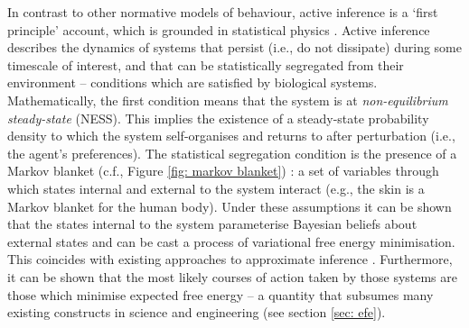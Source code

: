\documentclass{article}
\begin{document}
In contrast to other normative models of behaviour, active inference is a ‘first principle’ account, which is grounded in statistical physics \cite{parrMarkovBlanketsInformation2019,fristonFreeEnergyPrinciple2019}. Active inference describes the dynamics of systems that persist (i.e., do not dissipate) during some timescale of interest, and that can be statistically segregated from their environment -- conditions which are satisfied by biological systems. Mathematically, the first condition means that the system is at \textit{non-equilibrium steady-state} (NESS). This implies the existence of a steady-state probability density to which the system self-organises and returns to after perturbation (i.e., the agent's preferences). The statistical segregation condition is the presence of a Markov blanket (c.f., Figure \ref{fig: markov blanket}) \cite{kirchhoffMarkovBlanketsLife2018,pearlGraphicalModelsProbabilistic1998}: a set of variables through which states internal and external to the system interact (e.g., the skin is a Markov blanket for the human body). Under these assumptions it can be shown that the states internal to the system parameterise Bayesian beliefs about external states and can be cast a process of variational free energy minimisation. This coincides with existing approaches to approximate inference \cite{bishopPatternRecognitionMachine2006,bealVariationalAlgorithmsApproximate2003,bleiVariationalInferenceReview2017,jordanIntroductionVariationalMethods1998}. Furthermore, it can be shown that the most likely courses of action taken by those systems are those which minimise expected free energy -- a quantity that subsumes many existing constructs in science and engineering (see section \ref{sec: efe}).
\end{document}
